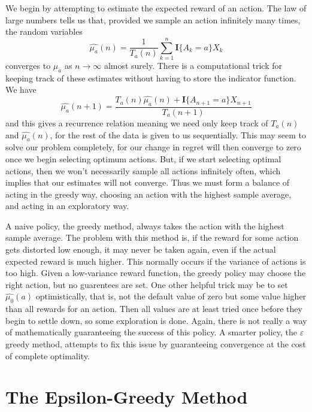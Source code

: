 We begin by attempting to estimate the expected reward of an action. The law of large numbers tells us that, provided we sample an action infinitely many times, the random variables
%
\[ \widehat{\mu_a}(n) = \frac{1}{T_a(n)} \sum_{k = 1}^n \mathbf{I} \{A_k = a \} X_k \]
%
converges to $\mu_a$ as $n \to \infty$ almost surely. There is a computational trick for keeping track of these estimates without having to store the indicator function. We have
%
\[ \widehat{\mu_a}(n+1) = \frac{T_a(n) \widehat{\mu_a}(n) + \mathbf{I} \{ A_{n+1} = a \} X_{n+1}}{T_a(n+1)} \]
%
and this gives a recurrence relation meaning we need only keep track of $T_a(n)$ and $\widehat{\mu_a}(n)$, for the rest of the data is given to us sequentially. This may seem to solve our problem completely, for our change in regret will then converge to zero once we begin selecting optimum actions. But, if we start selecting optimal actions, then we won't necessarily sample all actions infinitely often, which implies that our estimates will not converge. Thus we must form a balance of acting in the greedy way, choosing an action with the highest sample average, and acting in an exploratory way.

A naive policy, the greedy method, always takes the action with the highest sample average. The problem with this method is, if the reward for some action gets distorted low enough, it may never be taken again, even if the actual expected reward is much higher. This normally occurs if the variance of actions is too high. Given a low-variance reward function, the greedy policy may choose the right action, but no guarentees are set. One other helpful trick may be to set $\widehat{\mu_0}(a)$ optimistically, that is, not the default value of zero but some value higher than all rewards for an action. Then all values are at least tried once before they begin to settle down, so some exploration is done. Again, there is not really a way of mathematically guaranteeing the success of this policy. A smarter policy, the $\varepsilon$ greedy method, attempts to fix this issue by guaranteeing convergence at the cost of complete optimality.

\section{The Epsilon-Greedy Method}

